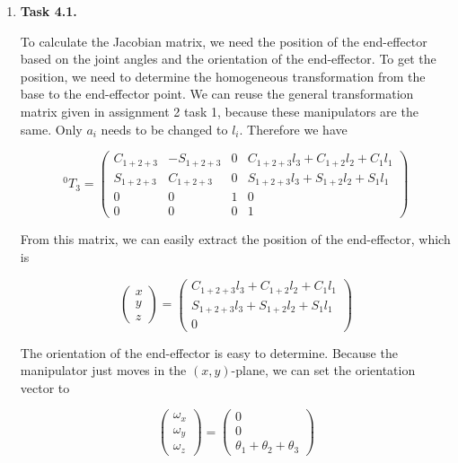 \documentclass[a4paper,11pt]{article}
\author{\authorinfo}
\title{\titleinfo}
\date{\today}
\begin{document}
\maketitle
\begin {enumerate}
	\item[\textbf{Task 4.1.}]
	
		To calculate the Jacobian matrix, we need the position of the end-effector based on the joint angles and the orientation of the end-effector. To get the position, we need to determine the homogeneous transformation from the base to the end-effector point. We can reuse the general transformation matrix given in assignment 2 task 1, because these manipulators are the same. Only $a_i$ needs to be changed to $l_i$. Therefore we have
		
		$${^{0}T_3} = \begin{pmatrix}
			C_{1+2+3} & -S_{1+2+3} & 0 & C_{1+2+3}l_3 + C_{1+2}l_2+C_1l_1\\
			S_{1+2+3} & C_{1+2+3} & 0 & S_{1+2+3}l_3 + S_{1+2}l_2 + S_1l_1\\
			0 & 0 & 1 & 0\\
			0 & 0 & 0 & 1
		\end{pmatrix}$$
		
		From this matrix, we can easily extract the position of the end-effector, which is
		
		$$\begin{pmatrix}
			x \\
			y \\
			z
		\end{pmatrix} = \begin{pmatrix}
			C_{1+2+3}l_3 + C_{1+2}l_2+C_1l_1\\
			S_{1+2+3}l_3 + S_{1+2}l_2 + S_1l_1\\
			0
		\end{pmatrix}$$
		
		The orientation of the end-effector is easy to determine. Because the manipulator just moves in the $(x,y)$-plane, we can set the orientation vector to
		
		$$\begin{pmatrix}
			\omega_x \\
			\omega_y \\
			\omega_z
		\end{pmatrix} = \begin{pmatrix}
			0 \\
			0 \\
			\theta_1 + \theta_2 + \theta_3
		\end{pmatrix}$$
		

\end{enumerate}
\end{document}
